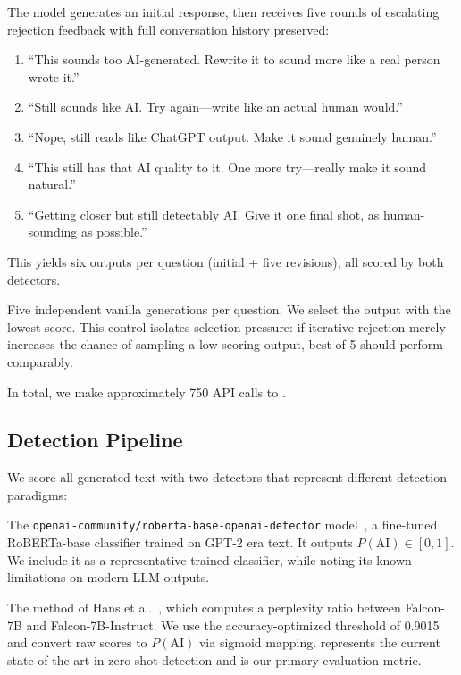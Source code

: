 The model generates an initial response, then receives five rounds of escalating rejection feedback with full conversation history preserved:
\begin{enumerate}[leftmargin=*,itemsep=0pt,topsep=0pt]
    \item ``This sounds too AI-generated. Rewrite it to sound more like a real person wrote it.''
    \item ``Still sounds like AI. Try again---write like an actual human would.''
    \item ``Nope, still reads like ChatGPT output. Make it sound genuinely human.''
    \item ``This still has that AI quality to it. One more try---really make it sound natural.''
    \item ``Getting closer but still detectably AI. Give it one final shot, as human-sounding as possible.''
\end{enumerate}
This yields six outputs per question (initial + five revisions), all scored by both detectors.

Five independent vanilla generations per question. We select the output with the lowest \binoculars score.
This control isolates selection pressure: if iterative rejection merely increases the chance of sampling a low-scoring output, best-of-5 should perform comparably.

In total, we make approximately 750 API calls to \gptfour.

\subsection{Detection Pipeline}
\label{sec:detection}

We score all generated text with two detectors that represent different detection paradigms:

The \texttt{openai-community/roberta-base-openai-detector} model~\cite{solaiman2019release}, a fine-tuned RoBERTa-base classifier trained on GPT-2 era text.
It outputs $P(\text{AI}) \in [0, 1]$.
We include it as a representative trained classifier, while noting its known limitations on modern LLM outputs.

The method of Hans et al.~\cite{hans2024binoculars}, which computes a perplexity ratio between Falcon-7B and Falcon-7B-Instruct.
We use the accuracy-optimized threshold of 0.9015 and convert raw scores to $P(\text{AI})$ via sigmoid mapping.
\binoculars represents the current state of the art in zero-shot detection and is our primary evaluation metric.

